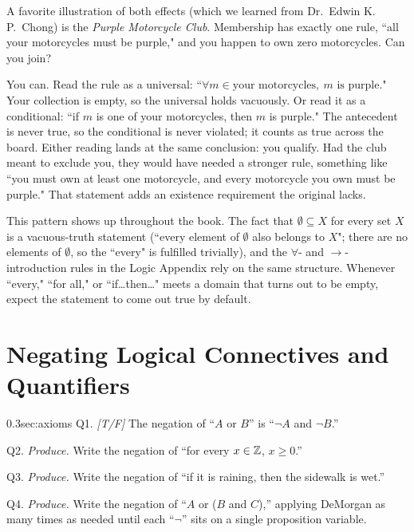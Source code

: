 A favorite illustration of both effects (which we learned from Dr.\ Edwin
K.\,P.\ Chong) is the \textit{Purple Motorcycle Club}. Membership has exactly
one rule, ``all your motorcycles must be purple," and you happen to own zero
motorcycles. Can you join?

You can. Read the rule as a universal: ``$\forall m \in \text{your
motorcycles},\ m\text{ is purple}$." Your collection is empty, so the
universal holds vacuously. Or read it as a conditional: ``if $m$ is one of
your motorcycles, then $m$ is purple." The antecedent is never true, so the
conditional is never violated; it counts as true across the board. Either
reading lands at the same conclusion: you qualify. Had the club meant to
exclude you, they would have needed a stronger rule, something like ``you
must own at least one motorcycle, and every motorcycle you own must be
purple." That statement adds an existence requirement the original lacks.

This pattern shows up throughout the book. The fact that
$\emptyset \subseteq X$ for every set $X$ is a vacuous-truth statement
(``every element of $\emptyset$ also belongs to $X$"; there are no elements
of $\emptyset$, so the ``every" is fulfilled trivially), and the
$\forall$- and $\rightarrow$-introduction rules in the Logic Appendix rely on
the same structure. Whenever ``every," ``for all," or ``if\ldots then\ldots"
meets a domain that turns out to be empty, expect the statement to come out
true by default.
\newpage 
\section{Negating Logical Connectives and Quantifiers}
\label{sec:NegatingConnectives}

\begin{selfcheckbox}{0.3}{sec:axioms}
  \hypertarget{q:ch0:negations}{}
  Q1. \textit{[T/F]} The negation of ``$A$ or $B$'' is ``$\lnot A$ and $\lnot B$.''\par\smallskip
  Q2. \textit{Produce.} Write the negation of ``for every $x \in {\mathbb{Z}}$, $x \geq 0$.''\par\smallskip
  Q3. \textit{Produce.} Write the negation of ``if it is raining, then the sidewalk is wet.''\par\smallskip
  Q4. \textit{Produce.} Write the negation of ``$A$ or ($B$ and $C$),'' applying DeMorgan as many times as needed until each ``$\lnot$'' sits on a single proposition variable.
  \par\medskip\hfill{}
\end{selfcheckbox}

